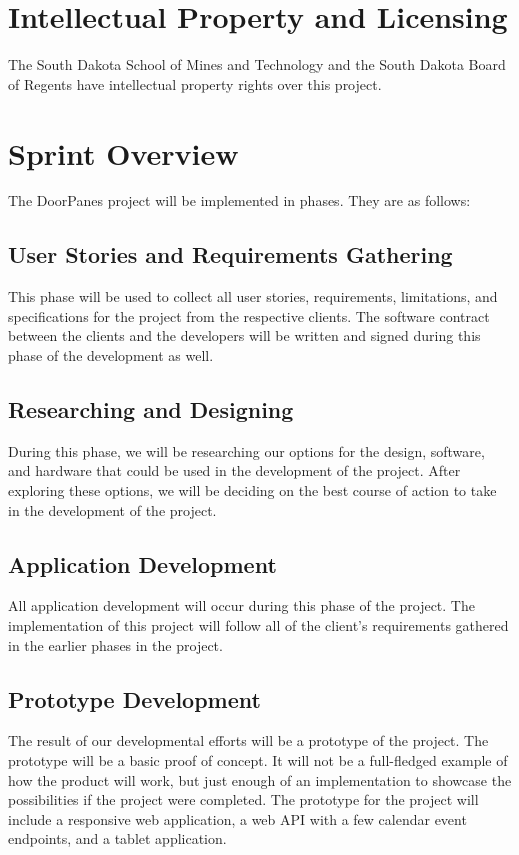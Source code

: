 \section{Intellectual Property and Licensing}
The South Dakota School of Mines and Technology and the South Dakota Board of Regents have intellectual property rights over this project.

\section{Sprint  Overview}
The DoorPanes project will be implemented in phases. They are as follows:

\subsection{User Stories and Requirements Gathering}
This phase will be used to collect all user stories, requirements, limitations, and specifications for the project from the respective clients. The software contract between the clients and the developers will be written and signed during this phase of the development as well.

\subsection{Researching and Designing}
During this phase, we will be researching our options for the design, software, and hardware that could be used in the development of the project. After exploring these options, we will be deciding on the best course of action to take in the development of the project.

\subsection{Application Development}
All application development will occur during this phase of the project. The implementation of this project will follow all of the client's requirements gathered in the earlier phases in the project.

\subsection{Prototype Development}
The result of our developmental efforts will be a prototype of the project. The prototype will be a basic proof of concept. It will not be a full-fledged example of how the product will work, but just enough of an implementation to showcase the possibilities if the project were completed. The prototype for the project will include a responsive web application, a web API with a few calendar event endpoints, and a tablet application. 

